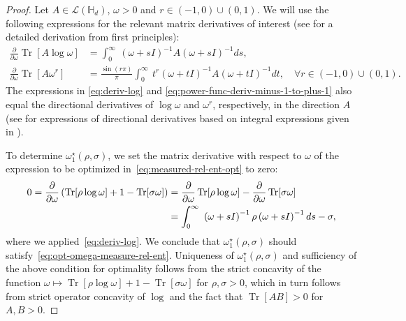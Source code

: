 \documentclass[a4paper,onecolumn,11pt,accepted=2026-05-12]{quantumarticle}
\DeclareMathOperator{\Tr}{Tr}
\newcommand{\cL}{\mathcal{L}}
\newcommand{\HH}{\mathbb{H}}
\begin{document}
\begin{proof}
Let $A \in \cL(\HH_d)$, $\omega>0$ and $r\in\left(-1,0\right)\cup\left(0,1\right)$. We will use the following expressions  for the relevant matrix derivatives of interest  (see \cite{wilde2025-QIM} for a detailed derivation from first principles):  
\begin{align}
\frac{\partial}{\partial \omega}\Tr[A\log \omega] & =\int_{0}^{\infty}\ \left(\omega+sI\right)^{-1}A\left(\omega+sI\right)^{-1}ds,\label{eq:deriv-log}\\
\frac{\partial}{\partial \omega}\Tr[A\omega^{r}] & =\frac{\sin(r\pi)}{\pi}\int_{0}^{\infty}\ t^{r}\left(\omega+tI\right)^{-1}A\left(\omega+tI\right)^{-1}dt, \quad \forall r\in\left(-1,0\right)\cup\left(0,1\right).\label{eq:power-func-deriv-minus-1-to-plus-1}
\end{align}
The expressions in \eqref{eq:deriv-log} and \eqref{eq:power-func-deriv-minus-1-to-plus-1} also equal the  directional derivatives of $\log \omega$ and $\omega^r$, respectively, in the direction $A$ (see \cite[Proof of Theorem 1 and 5]{SB-IT-2025} for expressions of directional derivatives based on integral expressions given in \cite[Lemma 2.8]{Carlen-2010}). 


To determine  $\omega_{1}^{\star}(\rho,\sigma)$,
we set the matrix derivative  with respect to $\omega$ of the expression to be optimized in~\eqref{eq:measured-rel-ent-opt} to zero:
\begin{align}
0=\frac{\partial}{\partial\omega}\left(\Tr[\rho\log\omega]+1-\Tr[\sigma\omega]\right) & =\frac{\partial}{\partial\omega}\Tr[\rho\log\omega]-\frac{\partial}{\partial\omega}\Tr[\sigma\omega] \notag\\
 & =\int_{0}^{\infty}\ \left(\omega+sI\right)^{-1}\rho\left(\omega+sI\right)^{-1}ds-\sigma, \notag
\end{align}
where we applied~\eqref{eq:deriv-log}. We conclude that  $\omega_{1}^{\star}(\rho,\sigma)$ should satisfy~\eqref{eq:opt-omega-measure-rel-ent}. 
Uniqueness of $\omega_{1}^{\star}(\rho,\sigma)$ and sufficiency of the above condition for optimality follows from the strict concavity of the function $\omega\mapsto\Tr[\rho\log\omega]+1-\Tr[\sigma\omega]$
for $\rho,\sigma>0$,  which in turn follows from strict operator concavity of $\log $ and the fact that $\Tr[AB]> 0$ for $A,B >0$. 


\end{proof}
\end{document}
